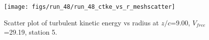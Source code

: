 \begin{figure}[H]
\centering
\texttt{[image: figs/run\_48/run\_48\_ctke\_vs\_r\_meshscatter]}
\caption{Scatter plot of turbulent kinetic energy vs radius at $z/c$=9.00, $V_{free}$=29.19, station 5.}
\label{fig:run_48_ctke_vs_r_meshscatter}
\end{figure}


